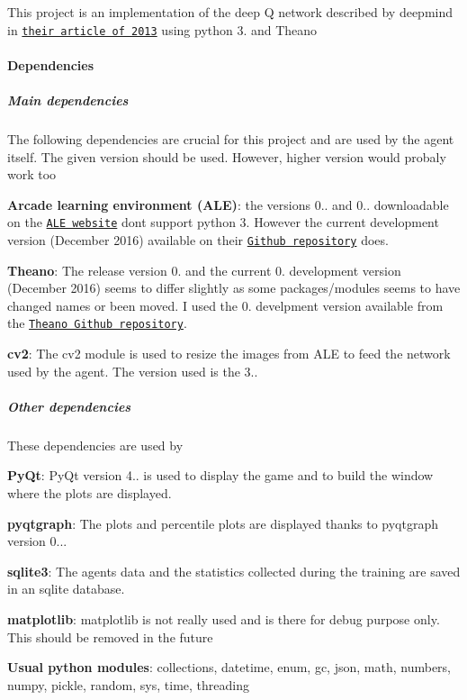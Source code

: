 This project is an implementation of the deep Q network described by deepmind in \href{https://arxiv.org/abs/1312.5602}{\tt their article of 2013} using python 3. and Theano 



\paragraph*{Dependencies}





\subparagraph*{Main dependencies}

The following dependencies are crucial for this project and are used by the agent itself. The given version should be used. However, higher version would probaly work too
\begin{DoxyItemize}
\item {\bfseries Arcade learning environment (A\+LE)}\+: the versions 0.. and 0.. downloadable on the \href{http://www.arcadelearningenvironment.org/downloads/}{\tt A\+LE website} don\textquotesingle{}t support python 3. However the current development version (December 2016) available on their \href{https://github.com/mgbellemare/Arcade-Learning-Environment}{\tt Github repository} does.
\item {\bfseries Theano}\+: The release version 0. and the current 0. development version (December 2016) seems to differ slightly as some packages/modules seems to have changed names or been moved. I used the 0. develpment version available from the \href{https://github.com/Theano/Theano}{\tt Theano Github repository}.
\item {\bfseries cv2}\+: The cv2 module is used to resize the images from A\+LE to feed the network used by the agent. The version used is the 3..
\end{DoxyItemize}

\subparagraph*{Other dependencies}

These dependencies are used by
\begin{DoxyItemize}
\item {\bfseries Py\+Qt}\+: Py\+Qt version 4.. is used to display the game and to build the window where the plots are displayed.
\item {\bfseries pyqtgraph}\+: The plots and percentile plots are displayed thanks to pyqtgraph version 0...
\item {\bfseries sqlite3}\+: The agent\textquotesingle{}s data and the statistics collected during the training are saved in an sqlite database.
\item {\bfseries matplotlib}\+: matplotlib is not really used and is there for debug purpose only. This should be removed in the future
\item {\bfseries Usual python modules}\+: collections, datetime, enum, gc, json, math, numbers, numpy, pickle, random, sys, time, threading
\end{DoxyItemize}





